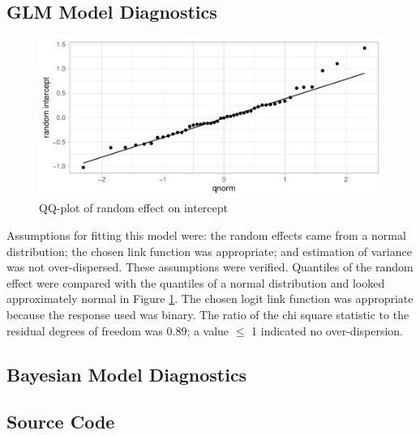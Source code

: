 \documentclass[12pt]{article}
\begin{document}
\hypertarget{glm-model-diagnostics}{%
\subsection{GLM Model Diagnostics}\label{glm-model-diagnostics}}

\label{sec:glmmd}

\begin{figure}[H]

{\centering \includegraphics{bookdown_report_files/figure-latex/qq-1} 

}

\caption{QQ-plot of random effect on intercept}\label{fig:qq}
\end{figure}

Assumptions for fitting this model were: the random effects came from a normal distribution; the chosen link function was appropriate; and estimation of variance was not over-dispersed. These assumptions were verified. Quantiles of the random effect were compared with the quantiles of a normal distribution and looked approximately normal in Figure \ref{fig:qq}. The chosen logit link function was appropriate because the response used was binary. The ratio of the chi square statistic to the residual degrees of freedom was 0.89; a value \(\le\) 1 indicated no over-dispersion.

\hypertarget{bayesian-model-diagnostics}{%
\subsection{Bayesian Model Diagnostics}\label{bayesian-model-diagnostics}}

\label{sec:bayesd}

\hypertarget{source-code}{%
\subsection{Source Code}\label{source-code}}
\end{document}
